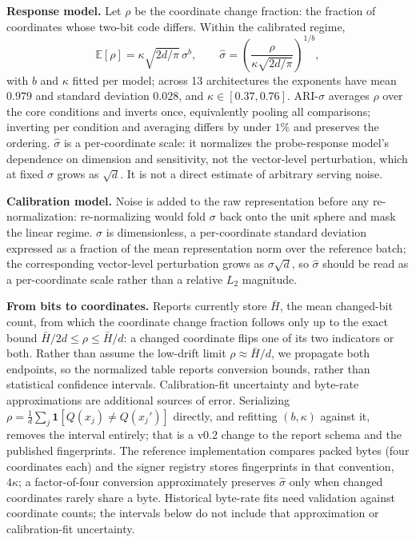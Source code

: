 \documentclass{article}
\begin{document}
\textbf{Response model.} Let $\rho$ be the coordinate change fraction: the fraction of coordinates whose two-bit code differs. Within the calibrated regime,
\[
\mathbb E[\rho]=\kappa\sqrt{2d/\pi}\,\sigma^{b},
\qquad
\hat{\sigma}=\left(\frac{\rho}{\kappa\sqrt{2d/\pi}}\right)^{\!1/b},
\]
with $b$ and $\kappa$ fitted per model; across 13 architectures the exponents have mean $0.979$ and standard deviation $0.028$, and $\kappa\in[0.37,0.76]$. ARI-$\hat\sigma$ averages $\rho$ over the core conditions and inverts once, equivalently pooling all comparisons; inverting per condition and averaging differs by under $1\%$ and preserves the ordering. $\hat\sigma$ is a per-coordinate scale: it normalizes the probe-response model's dependence on dimension and sensitivity, not the vector-level perturbation, which at fixed $\sigma$ grows as $\sqrt d$. It is not a direct estimate of arbitrary serving noise.

\textbf{Calibration model.} Noise is added to the raw representation before any re-normalization: re-normalizing would fold $\sigma$ back onto the unit sphere and mask the linear regime. $\sigma$ is dimensionless, a per-coordinate standard deviation expressed as a fraction of the mean representation norm over the reference batch; the corresponding vector-level perturbation grows as $\sigma\sqrt d$, so $\hat\sigma$ should be read as a per-coordinate scale rather than a relative $L_2$ magnitude.

\textbf{From bits to coordinates.} Reports currently store $\bar H$, the mean changed-bit count, from which the coordinate change fraction follows only up to the exact bound $\bar H/2d\le\rho\le\bar H/d$: a changed coordinate flips one of its two indicators or both. Rather than assume the low-drift limit $\rho\approx\bar H/d$, we propagate both endpoints, so the normalized table reports conversion bounds, rather than statistical confidence intervals. Calibration-fit uncertainty and byte-rate approximations are additional sources of error. Serializing $\rho=\tfrac1d\sum_j\mathbf 1[Q(x_j)\neq Q(x_j')]$ directly, and refitting $(b,\kappa)$ against it, removes the interval entirely; that is a v0.2 change to the report schema and the published fingerprints. The reference implementation compares packed bytes (four coordinates each) and the signer registry stores fingerprints in that convention, $4\kappa$; a factor-of-four conversion approximately preserves $\hat\sigma$ only when changed coordinates rarely share a byte. Historical byte-rate fits need validation against coordinate counts; the intervals below do not include that approximation or calibration-fit uncertainty.
\end{document}
